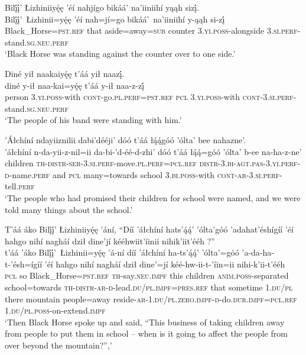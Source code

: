 \ea\label{ex:text1-31-12}
Bilį́į́’ Łizhiniiyę́ę ’éí nahjígo bikáá’ na’iiniihí yąąh sizį́.\\
\gll Bilį́į́’~{Łizhinii=yę́ę}	’éí	nah=jí=go	bikáá’~{na’iiniihí}	y-ąąh	si-zį́\\
     Black\_Horse=\textsc{pst}.\textsc{ref}	that	aside=away=\textsc{sub}	counter	3.\textsc{yi}.\textsc{poss}-alongside	3.\textsc{si}.\textsc{perf}-stand.\textsc{sg}.\textsc{neu}.\textsc{perf}\\
\glt `Black Horse was standing against the counter over to one side.'
\z

\newpage
\ea\label{ex:text1-31-13}
Diné yił naakaiyę́ę t’áá yił naazį́.\\
\gll diné	y-ił	naa-kai=yę́ę	t’áá	y-ił	naa-z-zį́\\
     person	3.\textsc{yi}.\textsc{poss}-with	\textsc{cont}-go.\textsc{pl}.\textsc{perf}=\textsc{pst}.\textsc{ref}	\textsc{pcl}	3.\textsc{yi}.\textsc{poss}-with	\textsc{cont}-3.\textsc{si}.\textsc{perf}-stand.\textsc{sg}.\textsc{neu}.\textsc{perf}\\
\glt `The people of his band were standing with him.'
\z

\ea\label{ex:text1-31-14}
’Áłchíní ndayiiznilii dabi’dééji’ dóó t’áá łą́ą́góó ’ólta’ bee nahazne’.\\
\gll ’áłchíní	n-da-yii-z-nil=ii	da-bi-’d-éé-d-zhi’	dóó	t’áá	łą́ą́=góó	’ólta’	b-ee	na-ha-z-ne’\\
     children	\textsc{th}-\textsc{distr}-\textsc{ser}-3.\textsc{si}.\textsc{perf}-move.\textsc{pl}.\textsc{perf}=\textsc{pcl}.\textsc{ref}	\textsc{distr}-3.\textsc{bi}-\textsc{agt}.\textsc{pas}-3.\textsc{yi}.\textsc{perf}-\textsc{d}-name.\textsc{perf}	and	\textsc{pcl}	many=towards	school	3.\textsc{bi}.\textsc{poss}-with	\textsc{cont}-\textsc{ar}-3.\textsc{si}.\textsc{perf}-tell.\textsc{perf}\\
\glt `The people who had promised their children for school were named, and we were told many things about the school.'
\z

\ea\label{ex:text1-32-1}
T’áá áko Bilį́į́’ Łizhiniiyę́ę ’ání, ``Díí ’áłchíní hats’ą́ą́’ ’ólta’góó ’adahat’éshígíí ’éí hahgo nihí nagháí dził dine’jí kééhwiit’íinii nihik’iit’ééh ?''\\
\gll t’áá	’áko	Bilį́į́’~{Łizhinii=yę́ę}	’á-ní	díí	’áłchíní	ha-ts’ą́ą́’	’ólta’=góó	’a-da-ha-t-’ésh=ígíí	’éí	hahgo	nihí	nagháí	dził	dine’=jí	kéé-hw-ii-t-’íin=ii	nihi-k’ii-t’ééh\\
     \textsc{pcl}	so	Black\_Horse=\textsc{pst}.\textsc{ref}	\textsc{th}-say.\textsc{neu}.\textsc{impf}	this	children	\textsc{anim}.\textsc{poss}-separated	school=towards	\textsc{th}-\textsc{distr}-\textsc{ar}-\textsc{d}-lead.\textsc{du}/\textsc{pl}.\textsc{impf}=\textsc{pres}.\textsc{ref}	that	sometime	1.\textsc{du}/\textsc{pl}	there	mountain	people=away	reside-\textsc{ar}-1.\textsc{du}/\textsc{pl}.\textsc{zero}.\textsc{impf}-\textsc{d}-do.\textsc{dur}.\textsc{impf}=\textsc{pcl}.\textsc{ref}	1.\textsc{du}/\textsc{pl}.\textsc{poss}-on-extend.\textsc{impf}\\
\glt `Then Black Horse spoke up and said, ``This business of taking children away from people to put them in school -- when is it going to affect the people from over beyond the mountain?'','
\z


